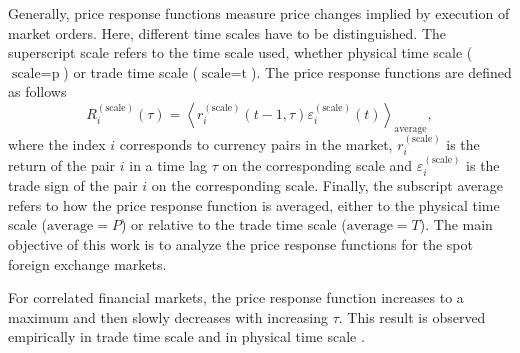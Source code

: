 Generally, price response functions measure price changes implied by execution
of market orders. Here, different time scales have to be distinguished. The
superscript scale refers to the time scale used, whether physical time scale
($\textrm{scale} = \textrm{p}$) or trade time scale
($\textrm{scale} = \textrm{t}$). The price response functions are defined as
follows
\begin{equation}\label{eq:response_general}
    R^{\left(\textrm{scale}\right)}_{i}\left(\tau\right)=\left\langle
    r^{\left(\textrm{scale}\right)}_{i}\left(t-1, \tau\right)
    \varepsilon^{\left(\textrm{scale}\right)}_{i} \left(t\right)\right\rangle
    _{\textrm{average}},
\end{equation}
where the index $i$ corresponds to currency pairs in the market,
$r^{\left(\textrm{scale}\right)}_{i}$ is the return of the pair $i$ in a time
lag $\tau$ on the corresponding scale and
$\varepsilon^{\left(\textrm{scale}\right)}_{i}$ is the trade sign of the pair
$i$ on the corresponding scale.  Finally, the subscript average refers to how
the price response function is averaged, either to the physical time scale
($\textrm{average} = P$) or relative to the trade time scale
($\textrm{average} = T$). The main objective of this work is to analyze the
price response functions for the spot foreign exchange markets.

For correlated financial markets, the price response function increases to a
maximum and then slowly decreases with increasing $\tau$. This result is
observed empirically in trade time scale and in physical time scale
\cite{my_paper_response_financial,Wang_2016_avg}.